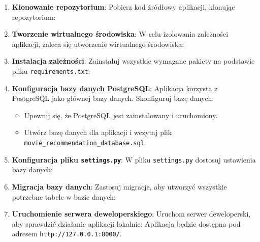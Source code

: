 \documentclass[../main.tex]{subfiles}
\begin{document}
\begin{enumerate}
	\item \textbf{Klonowanie repozytorium}: Pobierz kod źródłowy aplikacji, klonując repozytorium:
	\item \textbf{Tworzenie wirtualnego środowiska}: W celu izolowania zależności aplikacji, zaleca się utworzenie wirtualnego środowiska:
	\item \textbf{Instalacja zależności}: Zainstaluj wszystkie wymagane pakiety na podstawie pliku \texttt{requirements.txt}:
	\item \textbf{Konfiguracja bazy danych PostgreSQL}: Aplikacja korzysta z PostgreSQL jako głównej bazy danych. Skonfiguruj bazę danych:
	\begin{itemize}
		\item Upewnij się, że PostgreSQL jest zainstalowany i uruchomiony.
		\item Utwórz bazę danych dla aplikacji i wczytaj plik \linebreak
		\texttt{movie\_recommendation\_database.sql}.
	\end{itemize}
	\item \textbf{Konfiguracja pliku \texttt{settings.py}}: W pliku \texttt{settings.py} dostosuj ustawienia bazy danych:
	\item \textbf{Migracja bazy danych}: Zastosuj migracje, aby utworzyć wszystkie potrzebne tabele w bazie danych:
	\item \textbf{Uruchomienie serwera deweloperskiego}: Uruchom serwer deweloperski, aby sprawdzić działanie aplikacji lokalnie:
	Aplikacja będzie dostępna pod adresem \texttt{http://127.0.0.1:8000/}.

\end{enumerate}
\end{document}
